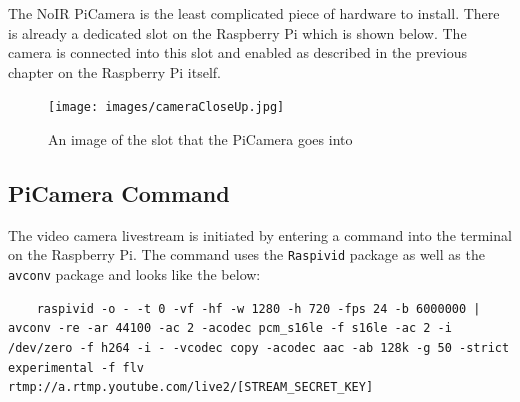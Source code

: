 \documentclass[10pt,a4paper]{article}
\begin{document}
The NoIR PiCamera is the least complicated piece of hardware to install. There is already a dedicated slot on the Raspberry Pi which is shown below. The camera is connected into this slot and enabled as described in the previous chapter on the Raspberry Pi itself. 

\begin{figure}[H]
  \centering
    \texttt{[image: images/cameraCloseUp.jpg]}
    \caption{An image of the slot that the PiCamera goes into}
    \label{fig:piCamCloseUp}
\end{figure}

\subsection{PiCamera Command}
The video camera livestream is initiated by entering a command into the terminal on the Raspberry Pi. The command uses the \texttt{Raspivid} package as well as the \texttt{avconv} package and looks like the below:
\begin{verbatim}
    raspivid -o - -t 0 -vf -hf -w 1280 -h 720 -fps 24 -b 6000000 | avconv -re -ar 44100 -ac 2 -acodec pcm_s16le -f s16le -ac 2 -i /dev/zero -f h264 -i - -vcodec copy -acodec aac -ab 128k -g 50 -strict experimental -f flv rtmp://a.rtmp.youtube.com/live2/[STREAM_SECRET_KEY]
\end{verbatim}
\end{document}
